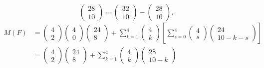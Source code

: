 \begin{example}
\begin{equation*}
                        \begin{pmatrix} 28 \\ 10    \end{pmatrix} =
                        \begin{pmatrix} 32 \\ 10    \end{pmatrix} -
                        \begin{pmatrix} 28 \\ 10    \end{pmatrix},
    \end{equation*}
    \begin{align*}
      M(F) &= \begin{pmatrix}  4 \\ 2 \end{pmatrix}\begin{pmatrix}  4 \\ 0 \end{pmatrix} 
              \begin{pmatrix} 24 \\ 8 \end{pmatrix} + 
              \sum^{4}_{k=1}\begin{pmatrix} 4  \\ k \end{pmatrix}
                      \left[\sum^{4}_{s=0}\begin{pmatrix}  4 \\ s \end{pmatrix}
                            \begin{pmatrix} 24 \\ 10 - k - s \end{pmatrix}
                      \right]                                                                   \\
           &= \begin{pmatrix}  4 \\ 2 \end{pmatrix}\begin{pmatrix} 24 \\ 8 \end{pmatrix} +
              \sum^{4}_{k=1}\begin{pmatrix}  4 \\ k \end{pmatrix}
                            \begin{pmatrix} 28 \\ 10 - k \end{pmatrix}                          \\

\end{align*}
\end{example}
